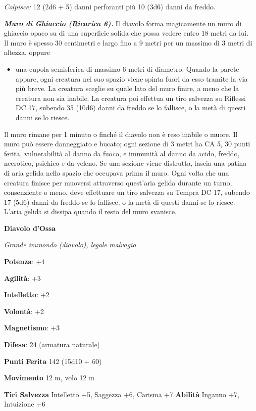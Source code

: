 \begin{multicols}{2}
\emph{Colpisce:} 12 (2d6 + 5) danni perforanti più 10 (3d6) danni da
freddo.




\emph{\textbf{Muro di Ghiaccio (Ricarica 6).}} Il diavolo forma
magicamente un muro di ghiaccio opaco su di una superficie solida che
possa vedere entro 18 metri da lui. Il muro è spesso 30 centimetri e
largo fino a 9 metri per un massimo di 3 metri di altezza, oppure


\begin{itemize}
\item
  una cupola semisferica di massimo 6 metri di diametro. Quando la
  parete appare, ogni creatura nel suo spazio viene spinta fuori da esso
  tramite la via più breve. La creatura sceglie su quale lato del muro
  finire, a meno che la creatura non sia inabile. La creatura poi
  effettua un tiro salvezza su Riflessi DC 17, subendo 35 (10d6) danni
  da freddo se lo fallisce, o la metà di questi danni se lo riesce.
\end{itemize}


Il muro rimane per 1 minuto o finché il diavolo non è reso inabile o
muore. Il muro può essere danneggiato e bucato; ogni sezione di 3 metri
ha CA 5, 30 punti ferita, vulnerabilità al danno da fuoco, e immunità al
danno da acido, freddo, necrotico, psichico e da veleno. Se una sezione
viene distrutta, lascia una patina di aria gelida nello spazio che
occupava prima il muro. Ogni volta che una creatura finisce per muoversi
attraverso quest'aria gelida durante un turno, consenziente o meno, deve
effettuare un tiro salvezza su Tempra DC 17, subendo 17 (5d6)
danni da freddo se lo fallisce, o la metà di questi danni se lo riesce.
L'aria gelida si dissipa quando il resto del muro svanisce.


\textbf{Diavolo d'Ossa}

\emph{Grande immondo (diavolo), legale malvagio}

\textbf{Potenza}: +4

\textbf{Agilità}: +3

\textbf{Intelletto}: +2

\textbf{Volontà}: +2

\textbf{Magnetismo}: +3

\textbf{Difesa}: 24 (armatura naturale)

\textbf{Punti Ferita} 142 (15d10 + 60)

\textbf{Movimento} 12 m, volo 12 m

\textbf{Tiri Salvezza} Intelletto +5, Saggezza +6, Carisma +7
\textbf{Abilità} Inganno +7, Intuizione +6


\end{multicols}
